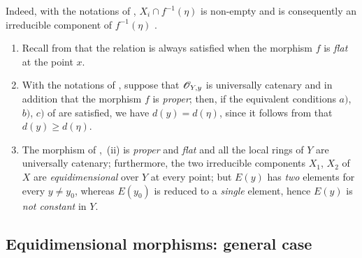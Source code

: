 Indeed, with the notations of , $X_i\cap f^{-1}(\eta)$ is non-empty and is consequently an irreducible component of $f^{-1}(\eta)$ .

\begin{remarks}[13.2.12]
\label{IV.13.2.12}
\begin{enumerate}[label=(\roman*)]
  \item Recall from  that the relation  is always satisfied when the morphism $f$ is \emph{flat} at the point $x$.
  \item With the notations of , suppose that $\mathscr{O}_{Y,y}$ is universally catenary and in addition that the morphism $f$ is \emph{proper}; then, if the equivalent conditions $a)$, $b)$, $c)$ of  are satisfied, we have $d(y)=d(\eta)$, since it follows from  that $d(y)\geq d(\eta)$.
  \item The morphism of ,~(ii) is \emph{proper} and \emph{flat} and all the local rings of $Y$ are universally catenary; furthermore, the two irreducible components $X_1$, $X_2$ of $X$ are \emph{equidimensional} over $Y$ at every point; but $E(y)$ has \emph{two} elements for every $y\neq y_0$, whereas $E(y_0)$ is reduced to a \emph{single} element, hence $E(y)$ is \emph{not constant} in $Y$.
\end{enumerate}
\end{remarks}

\subsection{Equidimensional morphisms: general case}
\label{subsection:IV.13.3}

